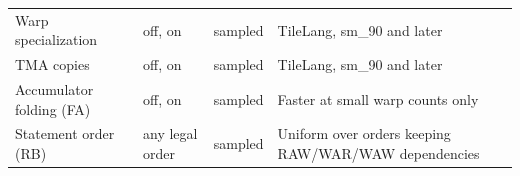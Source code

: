 \begin{table}[t]
\begin{tabular}{llll}
Warp specialization           & off, on                         & sampled    & TileLang, sm\_90 and later \\
TMA copies                    & off, on                         & sampled    & TileLang, sm\_90 and later \\
Accumulator folding (FA)      & off, on                         & sampled    & Faster at small warp counts only \\
Statement order (RB)          & any legal order                 & sampled    & Uniform over orders keeping RAW/WAR/WAW dependencies \\
\hline
\end{tabular}
\end{table}